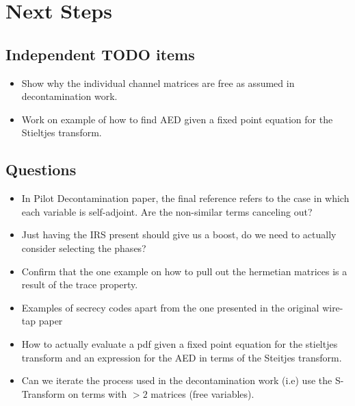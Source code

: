 \documentclass[12pt,a4paper]{report}
\begin{document}

\chapter{Next Steps}
\section{Independent TODO items}
\begin{itemize}
\item 
	Show why the individual channel matrices are free as assumed in decontamination work.
\item
	Work on example of how to find AED given a fixed point equation for the Stieltjes transform.
\end{itemize}
\section{Questions}
\begin{itemize}
\item
	In Pilot Decontamination paper, the final reference refers to the case in which each variable is self-adjoint.
	Are the non-similar terms canceling out?
\item 
	Just having the IRS present should give us a boost, do we need to actually consider selecting the phases?
	
\item 
	Confirm that the one example on how to pull out the hermetian matrices is a result of the trace property.
	
\item 
	Examples of secrecy codes apart from the one presented in the original wire-tap paper
	
\item 
	How to actually evaluate a pdf given a fixed point equation for the stieltjes transform and an expression for the
	AED in terms of the Steitjes transform. 
	
\item 
	Can we iterate the process used in the decontamination work (i.e) use the S-Transform on terms with $>2$
	 matrices (free variables).
\end{itemize}


\end{document}

